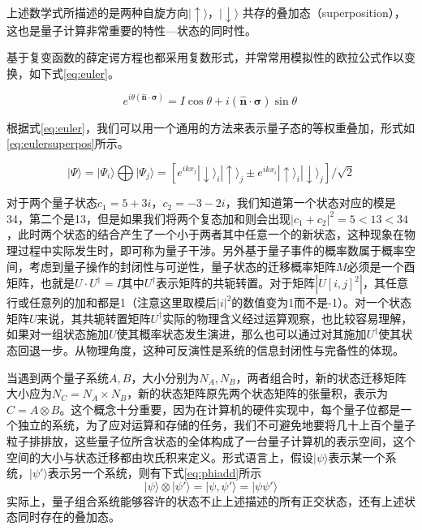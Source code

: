 \documentclass[UTF8, 11pt, a4paper]{ctexart}
\begin{document}
上述数学式所描述的是两种自旋方向$|\uparrow\rangle$，$|\downarrow\rangle$ 共存的叠加态（superposition），这也是量子计算非常重要的特性—状态的同时性。

基于复变函数的薛定谔方程也都采用复数形式，并常常用模拟性的欧拉公式作以变换，如下式\ref{eq:euler}。

\begin{equation}
\label{eq:euler}
e^{{i\theta ({\hat  {{\mathbf  {n}}}}\cdot {\boldsymbol  {\sigma }})}}=I\cos \theta +i({\hat  {{\mathbf  {n}}}}\cdot {\boldsymbol  {\sigma }})\sin \theta \,
\end{equation}

根据式\ref{eq:euler}，我们可以用一个通用的方法来表示量子态的等权重叠加，形式如\ref{eq:eulersuperpos}所示。

\begin{equation}
\label{eq:eulersuperpos}
|\Psi\rangle =  |\Psi_i\rangle \bigoplus |\Psi_j\rangle = \left[ e^{ikx_j}|\downarrow\rangle_i |\uparrow\rangle_j \pm e^{ikx_i}|\uparrow\rangle_i |\downarrow\rangle_j \right] / \sqrt{2}
\end{equation}

对于两个量子状态$c_1=5+3i ，c_2=-3-2i$，我们知道第一个状态对应的模是34，第二个是13，但是如果我们将两个复态加和则会出现$|c_1+c_2|^2=5<13<34$，此时两个状态的结合产生了一个小于两者其中任意一个的新状态，这种现象在物理过程中实际发生时，即可称为量子干涉。另外基于量子事件的概率数属于概率空间，考虑到量子操作的封闭性与可逆性，量子状态的迁移概率矩阵$M$必须是一个酉矩阵，也就是$U\cdot U^{\dagger}=I$其中$U^{\dagger}$表示矩阵的共轭转置。对于矩阵$|U[i,j]^2|$，其任意行或任意列的加和都是1（注意这里取模后$|i|^2$的数值变为1而不是-1）。对一个状态矩阵$U$来说，其共轭转置矩阵$U^\dagger$实际的物理含义经过运算观察，也比较容易理解，如果对一组状态施加$U$使其概率状态发生演进，那么也可以通过对其施加$U^\dagger$使其状态回退一步。从物理角度，这种可反演性是系统的信息封闭性与完备性的体现。

当遇到两个量子系统$A,B$，大小分别为$N_A,N_B$，两者组合时，新的状态迁移矩阵大小应为$N_C=N_A \times N_B$，新的状态矩阵原先两个状态矩阵的张量积，表示为$C=A\otimes B$。这个概念十分重要，因为在计算机的硬件实现中，每个量子位都是一个独立的系统，为了应对运算和存储的任务，我们不可避免地要将几十上百个量子粒子排排放，这些量子位所含状态的全体构成了一台量子计算机的表示空间，这个空间的大小与状态迁移都由坎氏积来定义。形式语言上，假设$| \psi \rangle$表示某一个系统，$| \psi ' \rangle$表示另一个系统，则有下式\ref{eq:phiadd}所示
\begin{equation}
\label{eq:phiadd}
| \psi \rangle \otimes | \psi ' \rangle = | \psi , \psi ' \rangle = | \psi \psi ' \rangle
\end{equation}
实际上，量子组合系统能够容许的状态不止上述描述的所有正交状态，还有上述状态同时存在的叠加态。
\end{document}
